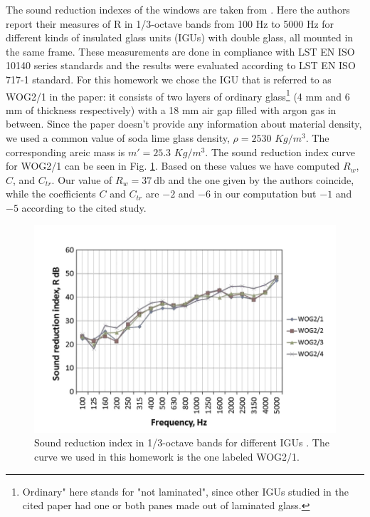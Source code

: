 \documentclass[]{scrartcl}
\begin{document}
The sound reduction indexes of the windows are taken from \cite{Window}. Here the authors report their measures of R in 1/3-octave bands from 100 Hz to 5000 Hz for different kinds of insulated glass units (IGUs) with double glass, all mounted in the same frame. These measurements are done in compliance with LST EN ISO 10140 series standards and the results were evaluated according to LST EN ISO 717-1 standard. For this homework we chose the IGU that is referred to  as WOG2/1 in the paper: it consists of two layers of ordinary glass\footnote{Ordinary" here stands for "not laminated", since other IGUs studied in the cited paper had one or both panes made out of laminated glass.} (4 mm and 6 mm of thickness respectively) with a 18 mm air gap filled with argon gas in between. Since the paper doesn't provide any information about material density, we used a common value of soda lime glass density, $ \rho = 2530$ $Kg/m^3$. The corresponding areic mass is $m' = 25.3$ $Kg/m^3$. 
The sound reduction index curve for WOG2/1 can be seen in Fig. \ref{fig:sri_win}. Based on these values we have computed $R_w$, $C$, and $C_{tr}$. Our value of $R_w = \SI{37}{\decibel}$ and the one given by the authors coincide, while the coefficients $C$ and $C_{tr}$ are $-2$ and $-6$ in our computation but $-1$ and $-5$ according to the cited study. 

\begin{figure}
	\centering
	\includegraphics[width=0.7\linewidth]{windows_sound_reduction}
	\caption{Sound reduction index in 1/3-octave bands for different IGUs \cite{Window}. The curve we used in this homework is the one labeled WOG2/1.}
	\label{fig:sri_win}
\end{figure}
\end{document}
